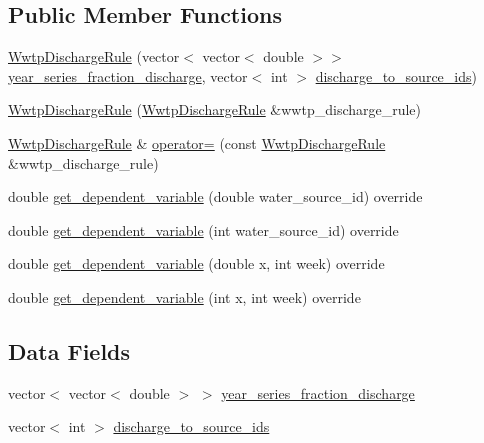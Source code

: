 \subsection*{Public Member Functions}
\begin{DoxyCompactItemize}
\item 
\mbox{\hyperlink{classWwtpDischargeRule_ae904657855c9d983ea0e5995109cd561_ae904657855c9d983ea0e5995109cd561}{Wwtp\+Discharge\+Rule}} (vector$<$ vector$<$ double $>$$>$ \mbox{\hyperlink{classWwtpDischargeRule_a5d193e0cbc2eb23e1b86e79fb2eafad3_a5d193e0cbc2eb23e1b86e79fb2eafad3}{year\+\_\+series\+\_\+fraction\+\_\+discharge}}, vector$<$ int $>$ \mbox{\hyperlink{classWwtpDischargeRule_ac2f77a9fca93eef3fd26ff1d579130be_ac2f77a9fca93eef3fd26ff1d579130be}{discharge\+\_\+to\+\_\+source\+\_\+ids}})
\item 
\mbox{\hyperlink{classWwtpDischargeRule_ac433e50df1414ba4bbb40022832b43ff_ac433e50df1414ba4bbb40022832b43ff}{Wwtp\+Discharge\+Rule}} (\mbox{\hyperlink{classWwtpDischargeRule}{Wwtp\+Discharge\+Rule}} \&wwtp\+\_\+discharge\+\_\+rule)
\item 
\mbox{\hyperlink{classWwtpDischargeRule}{Wwtp\+Discharge\+Rule}} \& \mbox{\hyperlink{classWwtpDischargeRule_acde020b347aff843179a318a9d231c8f_acde020b347aff843179a318a9d231c8f}{operator=}} (const \mbox{\hyperlink{classWwtpDischargeRule}{Wwtp\+Discharge\+Rule}} \&wwtp\+\_\+discharge\+\_\+rule)
\item 
double \mbox{\hyperlink{classWwtpDischargeRule_a4cea07bf746d200c9ca3018405a77a46_a4cea07bf746d200c9ca3018405a77a46}{get\+\_\+dependent\+\_\+variable}} (double water\+\_\+source\+\_\+id) override
\item 
double \mbox{\hyperlink{classWwtpDischargeRule_a3338c0fc43d656a6730ca72dd5d3e51e_a3338c0fc43d656a6730ca72dd5d3e51e}{get\+\_\+dependent\+\_\+variable}} (int water\+\_\+source\+\_\+id) override
\item 
double \mbox{\hyperlink{classWwtpDischargeRule_a10eb6f901b6479dadc107e0a7c07e03b_a10eb6f901b6479dadc107e0a7c07e03b}{get\+\_\+dependent\+\_\+variable}} (double x, int week) override
\item 
double \mbox{\hyperlink{classWwtpDischargeRule_a8eade5d595ec0fdc76769e67c7ffc5f4_a8eade5d595ec0fdc76769e67c7ffc5f4}{get\+\_\+dependent\+\_\+variable}} (int x, int week) override
\end{DoxyCompactItemize}
\subsection*{Data Fields}
\begin{DoxyCompactItemize}
\item 
vector$<$ vector$<$ double $>$ $>$ \mbox{\hyperlink{classWwtpDischargeRule_a5d193e0cbc2eb23e1b86e79fb2eafad3_a5d193e0cbc2eb23e1b86e79fb2eafad3}{year\+\_\+series\+\_\+fraction\+\_\+discharge}}
\item 
vector$<$ int $>$ \mbox{\hyperlink{classWwtpDischargeRule_ac2f77a9fca93eef3fd26ff1d579130be_ac2f77a9fca93eef3fd26ff1d579130be}{discharge\+\_\+to\+\_\+source\+\_\+ids}}
\end{DoxyCompactItemize}
